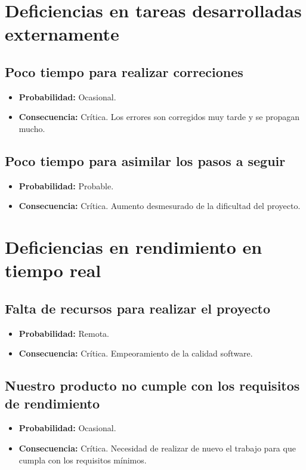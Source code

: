 \documentclass[spanish,a4paper,12pt]{report}	%
\begin{document}
%
\section{Deficiencias en tareas desarrolladas externamente}

\subsection*{Poco tiempo para realizar correciones}	
	\begin{itemize}
		\item \textbf {Probabilidad: }Ocasional.
		\item \textbf {Consecuencia: }Crítica. Los errores son corregidos muy tarde y se propagan mucho.
	\end{itemize}

\subsection*{Poco tiempo para asimilar los pasos a seguir}	
	\begin{itemize}
		\item \textbf {Probabilidad: }Probable.
		\item \textbf {Consecuencia: }Crítica. Aumento desmesurado de la dificultad del proyecto.
	\end{itemize}

%
\section{Deficiencias en rendimiento en tiempo real}

\subsection*{Falta de recursos para realizar el proyecto}	
	\begin{itemize}
		\item \textbf {Probabilidad: }Remota.
		\item \textbf {Consecuencia: }Crítica. Empeoramiento de la calidad software.
	\end{itemize}

\subsection*{Nuestro producto no cumple con los requisitos de rendimiento}	
	\begin{itemize}
		\item \textbf {Probabilidad: }Ocasional.
		\item \textbf {Consecuencia: }Crítica. Necesidad de realizar de nuevo el trabajo para que cumpla con los requisitos mínimos.
	\end{itemize}
\end{document}
